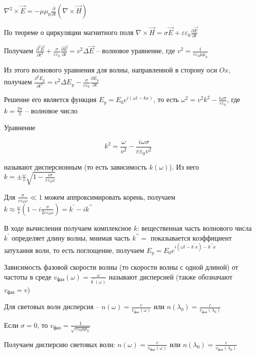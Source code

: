 \documentclass[12pt]{article}
\begin{document}
$\nabla^2 \times \vec E = -\mu\mu_0 \frac{\partial}{\partial t} (\nabla \times \vec H)$

По теореме о циркуляции магнитного поля $\nabla \times \vec H = \sigma \vec E + \varepsilon \varepsilon_0 \frac{\partial \vec E}{\partial t}$

Получаем $\frac{\partial^2 \vec E}{\partial t^2} + \frac{\sigma}{\varepsilon \varepsilon_0} \frac{\partial \vec E}{\partial t} = v^2 \Delta \vec E$ -- волновое уравнение, где $v^2 = \frac{1}{\varepsilon \varepsilon_0 \mu \mu_0}$

Из этого волнового уравнения для волны, направленной в сторону оси $Ox$, получаем $\frac{\partial^2 E_y}{\partial t^2} = v^2 \Delta E_y - \frac{\sigma}{\varepsilon \varepsilon_0} \frac{\partial E_y}{\partial t}$

Решение его является функция $E_y = E_0 e^{i (\omega t - k x)}$, то есть $\omega^2 = v^2 k^2 - \frac{i \omega \sigma}{\varepsilon \varepsilon_0}$, где $k = \frac{2\pi}{\lambda}$ -- волновое число

Уравнение 

\[k^2 = \frac{\omega}{v^2} - \frac{i \omega \sigma}{\varepsilon \varepsilon_0 v^2}\]

называют дисперсионным (то есть зависимость $k(\omega)$). Из него $k = \pm \frac{\omega}{v} \sqrt{1 - \frac{i \sigma}{\varepsilon \varepsilon_0 \omega}}$

Для $\frac{\sigma}{\varepsilon\varepsilon_0 \omega} \ll 1$ можем аппроксимировать корень, получаем $k \approx \frac{\omega}{v} \left(1 - i \frac{\sigma}{2\varepsilon\varepsilon_0 \omega}\right) = k^\prime - i k^{\prime\prime}$

В ходе вычисления получаем комплексное $k$: вещественная часть волнового числа $k^\prime$ определяет длину волны, мнимая часть $k^{\prime\prime} = $ показывается коэффициент затухания волн, то есть поглощение, получаем $E_y = E_0 e^{i (\omega t - k^{\prime} x) - k^{\prime\prime} x}$

Зависимость фазовой скорости волны (то скорости волны с одной длиной) от частоты в среде $v_\text{фаз}(\omega) = \frac{\omega}{k^{\prime}(\omega)}$ называют дисперсией (также обозначают $v_{\text{фаз}} = v$)

Для световых волн дисперсия -- $n(\omega) = \frac{c}{v_{\text{фаз}}(\omega)}$ или $n(\lambda_0) = \frac{c}{v_{\text{фаз}}(\lambda_0)}$

Если $\sigma = 0$, то $v_{\text{фаз}} = \frac{1}{\sqrt{\varepsilon \varepsilon_0 \mu \mu_0}}$

Получаем дисперсию световых волн: $n(\omega) = \frac{c}{v_{\text{фаз}}(\omega)}$ или $n(\lambda_0) = \frac{c}{v_{\text{фаз}}(\lambda_0)}$
\end{document}
